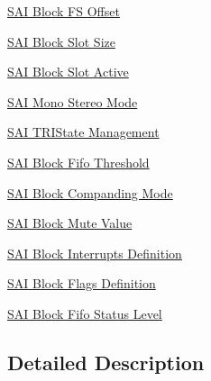 \begin{DoxyCompactItemize}
\hyperlink{group___s_a_i___block___f_s___offset}{S\+A\+I Block F\+S Offset}
\item 
\hyperlink{group___s_a_i___block___slot___size}{S\+A\+I Block Slot Size}
\item 
\hyperlink{group___s_a_i___block___slot___active}{S\+A\+I Block Slot Active}
\item 
\hyperlink{group___s_a_i___mono___stereo___mode}{S\+A\+I Mono Stereo Mode}
\item 
\hyperlink{group___s_a_i___t_r_i_state___management}{S\+A\+I T\+R\+I\+State Management}
\item 
\hyperlink{group___s_a_i___block___fifo___threshold}{S\+A\+I Block Fifo Threshold}
\item 
\hyperlink{group___s_a_i___block___companding___mode}{S\+A\+I Block Companding Mode}
\item 
\hyperlink{group___s_a_i___block___mute___value}{S\+A\+I Block Mute Value}
\item 
\hyperlink{group___s_a_i___block___interrupts___definition}{S\+A\+I Block Interrupts Definition}
\item 
\hyperlink{group___s_a_i___block___flags___definition}{S\+A\+I Block Flags Definition}
\item 
\hyperlink{group___s_a_i___block___fifo___status___level}{S\+A\+I Block Fifo Status Level}
\end{DoxyCompactItemize}


\subsection{Detailed Description}
